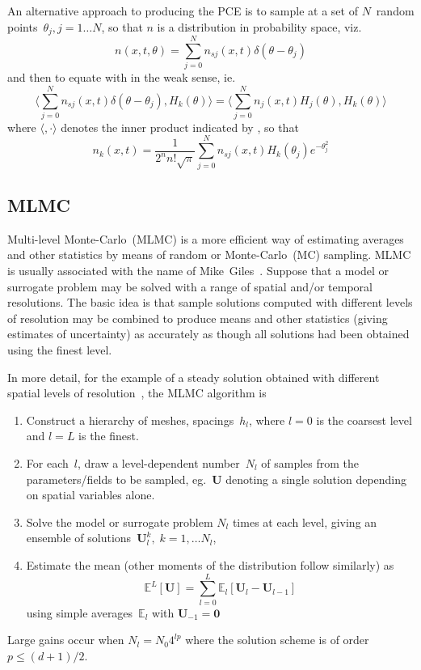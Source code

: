 An alternative approach to producing the PCE is to sample at a set of $N$~random
points~$\theta_j, j=1\ldots N$, so that
$n$ is a distribution in probability space, viz.
\begin{equation} \label{eq:dfnexpn}
n(x,t,\theta) = \sum_{j=0}^{N} n_{sj}(x,t)\delta(\theta-\theta_j)
\end{equation}
and then to equate with  in the weak sense, ie.
\begin{equation} \label{eq:hermweak}
\langle\sum_{j=0}^{N} n_{sj}(x,t)\delta(\theta-\theta_j), H_k(\theta)\rangle = 
\langle\sum_{j=0}^{N} n_{j}(x,t) H_j (\theta), H_k(\theta)\rangle 
\end{equation}
where $\langle,\cdot \rangle$ denotes the inner product indicated by \Eq{}, so that
\begin{equation} \label{eq:hermres}
n_k(x,t) = \frac{1}{2^nn!\sqrt{\pi}}\sum_{j=0}^{N} n_{sj}(x,t)H_k(\theta_j) e^{-\theta_j^2}
\end{equation}

\subsection{MLMC}\label{sec:mlmc}
Multi-level Monte-Carlo~(MLMC) is a more efficient way of estimating averages
and other statistics by means of random or Monte-Carlo~(MC) sampling. 
MLMC is usually associated with the name of Mike~Giles~\cite{Gi16Mult}.
Suppose that a model or surrogate problem may be solved with a range of
spatial and/or temporal resolutions. The basic idea is that sample solutions
computed with different levels of resolution may be combined to produce means
and other statistics 
(giving estimates of uncertainty) as accurately as though all solutions had been
obtained using the finest level.

In more detail, for the example of a steady solution obtained with
different spatial levels of resolution~\cite{Mi13Mult}, the MLMC algorithm is
\begin{enumerate}
\item Construct a hierarchy of meshes, spacings~$h_l$, where $l=0$ is the coarsest level
and $l=L$ is the finest.
\item For each~$l$, draw a level-dependent number~$N_l$ of samples from the parameters/fields
to be sampled, eg.\ 
${\mathbf U}$ denoting a single solution depending on spatial variables alone.
\item Solve the model or surrogate problem $N_l$ times at each level, giving an
ensemble of solutions~${\mathbf U}^k_l,\;k=1,\ldots N_l$,
\item Estimate the mean (other moments of the distribution follow similarly) as
\begin{equation}
{\mathbb E}^L[{\mathbf U}]= \sum_{l=0}^L {\mathbb E}_l[{\mathbf U}_l-{\mathbf U}_{l-1}]
\end{equation}
using simple averages~${\mathbb E}_l$ with ${\mathbf U}_{-1}={\mathbf 0}$
\end{enumerate}
Large gains occur when
$N_l=N_0 4^{lp}$ where the solution scheme is of order~$p\leq(d+1)/2$.

